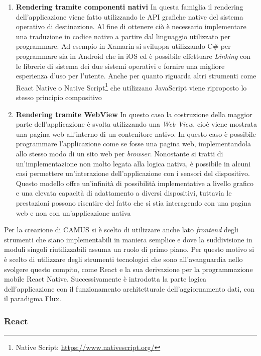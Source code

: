 \begin{enumerate}
	\item \textbf{Rendering tramite componenti nativi}
	In questa famiglia il rendering dell'applicazione viene fatto utilizzando le API grafiche native del sistema operativo di destinazione.
	Al fine di ottenere ciò è necessario implementare una traduzione in codice nativo a partire dal linguaggio utilizzato per programmare. Ad esempio in Xamarin si sviluppa utilizzando C\# per programmare sia in Android che in iOS ed è possibile effettuare \emph{Linking} con le librerie di sistema dei due sistemi operativi e fornire una migliore esperienza d'uso per l'utente. Anche per quanto riguarda altri strumenti come React Native o Native Script\footnote{Native Script: \url{https://www.nativescript.org/}} che utilizzano JavaScript viene riproposto lo stesso principio compositivo
	\item \textbf{Rendering tramite WebView}
	In questo caso la costruzione della maggior parte dell'applicazione è svolta utilizzando una \emph{Web View}, cioè viene mostrata una pagina web all'interno di un contenitore nativo.
	In questo caso è possibile programmare l'applicazione come se fosse una pagina web, implementandola allo stesso modo di un sito web per \emph{browser}. Nonostante si tratti di un'implementazione non molto legata alla logica nativa, è possibile in alcuni casi permettere un'interazione dell'applicazione con i sensori del dispositivo.
	Questo modello offre un'infinità di possibilità implementative a livello grafico e una elevata capacità di adattamento a diversi dispositivi, tuttavia le prestazioni possono risentire del fatto che si stia interagendo con una pagina web e non con un'applicazione nativa
\end{enumerate}

Per la creazione di CAMUS si è scelto di utilizzare anche lato \emph{frontend} degli strumenti che siano implementabili in maniera semplice e dove la suddivisione in moduli singoli riutilizzabili assuma un ruolo di primo piano. Per questo motivo si è scelto di utilizzare degli strumenti tecnologici che sono all'avanguardia nello svolgere questo compito, come React e la sua derivazione per la programmazione mobile React Native. Successivamente è introdotta la parte logica dell'applicazione con il funzionamento architetturale dell'aggiornamento dati, con il paradigma Flux.

\subsubsection{React}\label{sec:react}


